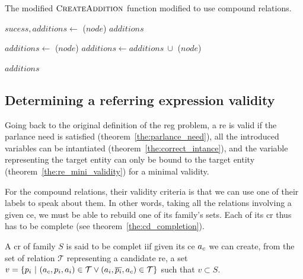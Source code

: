 \begin{algorithm}[ht!]
\caption{\label{alg:chap7_additions} The modified $\textsc{CreateAddition}$ function modified to use compound relations. }

\begin{algorithmic}

        \State $sucess, additions\leftarrow$ \typingadditions($node$)
            \Return $additions$
        \EndIf
        
        \State $additions\leftarrow$ \compoundadditions($node$) 
        \State $additions\leftarrow additions\ \cup$ \differenceadditions($node$) 
        
        \Return $additions$
    \EndFunction
    
\end{algorithmic}
\end{algorithm}

\subsection{Determining a referring expression validity}

Going back to the original definition of the \acrshort{reg} problem, a \acrshort{re} is valid if the parlance need is satisfied (theorem~\ref{the:parlance_need}), all the introduced variables can be intantiated (theorem~\ref{the:correct_intance}), and the variable representing the target entity can only be bound to the target entity (theorem~\ref{the:re_mini_validity}) for a minimal validity.

For the compound relations, their validity criteria is that we can use one of their labels to speak about them. In other words, taking all the relations involving a given \acrshort{ce}, we must be able to rebuild one of its family's sets. Each of its \acrshort{cr} thus has to be complete (see theorem~\ref{the:cd_completion}).

\begin{theorem} 
\label{the:cd_completion}
A \acrshort{cr} of family $S$ is said to be complet iif given its \acrshort{ce} $a_c$ we can create, from the set of relation $\mathcal{T}$ representing a candidate \acrshort{re}, a set $v = \{p_i\ |\ (a_c, p_i, a_i) \in \mathcal{T} \lor (a_i, \overline{p_i}, a_c) \in \mathcal{T} \}$ such that $v \subset S$.
\end{theorem}

